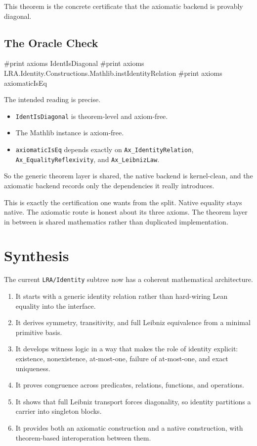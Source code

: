 \documentclass[11pt]{article}
\newcommand{\leaninline}[1]{\texttt{#1}}
\begin{document}
This theorem is the concrete certificate that the axiomatic backend is provably diagonal.

\subsection{The Oracle Check}

\begin{leanblock}
#print axioms IdentIsDiagonal
#print axioms LRA.Identity.Constructions.Mathlib.instIdentityRelation
#print axioms axiomaticIsEq
\end{leanblock}

The intended reading is precise.

\begin{itemize}[leftmargin=1.5em]
\item \leaninline{IdentIsDiagonal} is theorem-level and axiom-free.
\item The Mathlib instance is axiom-free.
\item \leaninline{axiomaticIsEq} depends exactly on \leaninline{Ax\_IdentityRelation}, \leaninline{Ax\_EqualityReflexivity}, and \leaninline{Ax\_LeibnizLaw}.
\end{itemize}

So the generic theorem layer is shared, the native backend is kernel-clean, and the axiomatic backend records only the dependencies it really introduces.

This is exactly the certification one wants from the split. Native equality stays native. The axiomatic route is honest about its three axioms. The theorem layer in between is shared mathematics rather than duplicated implementation.

\section{Synthesis}

The current \leaninline{LRA/Identity} subtree now has a coherent mathematical architecture.

\begin{enumerate}[leftmargin=1.5em]
\item It starts with a generic identity relation rather than hard-wiring Lean equality into the interface.
\item It derives symmetry, transitivity, and full Leibniz equivalence from a minimal primitive basis.
\item It develops witness logic in a way that makes the role of identity explicit: existence, nonexistence, at-most-one, failure of at-most-one, and exact uniqueness.
\item It proves congruence across predicates, relations, functions, and operations.
\item It shows that full Leibniz transport forces diagonality, so identity partitions a carrier into singleton blocks.
\item It provides both an axiomatic construction and a native construction, with theorem-based interoperation between them.
\end{enumerate}
\end{document}
